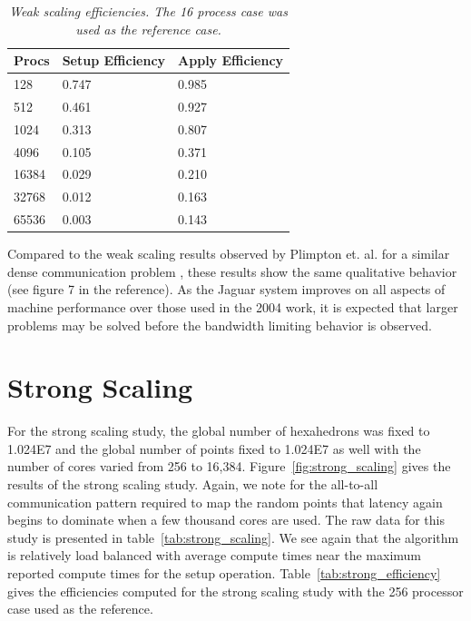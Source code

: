 \documentclass[note]{TechNote}
\begin{document}
\begin{table}[htpb!]
  \begin{center}
    \begin{tabular}{lll}\hline\hline
      \multicolumn{1}{c}{Procs}& 
      \multicolumn{1}{c}{Setup Efficiency} & 
      \multicolumn{1}{c}{Apply Efficiency}\\\hline\hline
      128 &	0.747 &	0.985 \\
      512 &	0.461 &	0.927 \\
      1024 &	0.313 &	0.807 \\
      4096 &	0.105 &	0.371 \\
      16384 &	0.029 &	0.210 \\
      32768 &	0.012 &	0.163 \\
      65536 &	0.003 &	0.143 \\
      \hline\hline
    \end{tabular}
  \end{center}
  \caption{\sl Weak scaling efficiencies. The 16 process case was used
    as the reference case.}
  \label{tab:weak_efficiency}
\end{table}

Compared to the weak scaling results observed by Plimpton et. al. for
a similar dense communication problem \cite{Plimpton_2004}, these
results show the same qualitative behavior (see figure 7 in the
reference). As the Jaguar system improves on all aspects of machine
performance over those used in the 2004 work, it is expected that
larger problems may be solved before the bandwidth limiting behavior
is observed.

\section{Strong Scaling}
For the strong scaling study, the global number of hexahedrons was
fixed to 1.024E7 and the global number of points fixed to 1.024E7 as
well with the number of cores varied from 256 to
16,384. Figure~\ref{fig:strong_scaling} gives the results of the
strong scaling study. Again, we note for the all-to-all communication
pattern required to map the random points that latency again begins to
dominate when a few thousand cores are used. The raw data for this
study is presented in table~\ref{tab:strong_scaling}. We see again
that the algorithm is relatively load balanced with average compute
times near the maximum reported compute times for the setup
operation. Table~\ref{tab:strong_efficiency} gives the efficiencies
computed for the strong scaling study with the 256 processor case used
as the reference.
\end{document}
